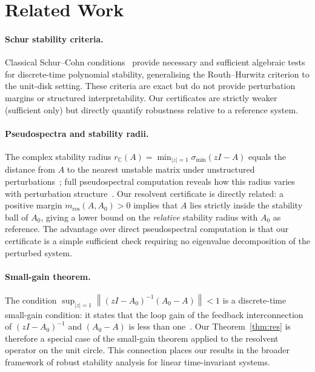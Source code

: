 \documentclass{article}
\theoremstyle{definition}
\newcommand{\C}{\mathbb{C}}
\newcommand{\norm}[1]{\left\|#1\right\|}
\begin{document}
\section{Related Work}
\label{sec:related}

\paragraph{Schur stability criteria.}
Classical Schur--Cohn conditions~\cite{jury1964inners} provide necessary and
sufficient algebraic tests for discrete-time polynomial stability, generalising
the Routh--Hurwitz criterion to the unit-disk setting.  These criteria are
exact but do not provide perturbation margins or structured interpretability.
Our certificates are strictly weaker (sufficient only) but directly quantify
robustness relative to a reference system.

\paragraph{Pseudospectra and stability radii.}
The complex stability radius $r_\C(A) = \min_{|z|=1} \sigma_{\min}(zI - A)$
equals the distance from $A$ to the nearest unstable matrix under unstructured
perturbations~\cite{hinrichsen1986stability}; full pseudospectral computation
reveals how this radius varies with perturbation structure~\cite{trefethen2005spectra}.
Our resolvent certificate is directly related: a positive margin
$m_{\mathrm{res}}(A, A_0) > 0$ implies that $A$ lies strictly inside the
stability ball of $A_0$, giving a lower bound on the \emph{relative} stability
radius with $A_0$ as reference.  The advantage over direct pseudospectral
computation is that our certificate is a simple sufficient check requiring
no eigenvalue decomposition of the perturbed system.

\paragraph{Small-gain theorem.}
The condition $\sup_{|z|=1}\norm{(zI-A_0)^{-1}(A_0-A)} < 1$ is a
discrete-time small-gain condition: it states that the loop gain of the
feedback interconnection of $(zI-A_0)^{-1}$ and $(A_0 - A)$ is less than
one~\cite{desoer1975feedback}.  Our Theorem~\ref{thm:res} is therefore a
special case of the small-gain theorem applied to the resolvent operator on the
unit circle.  This connection places our results in the broader framework of
robust stability analysis for linear time-invariant systems.
\end{document}
